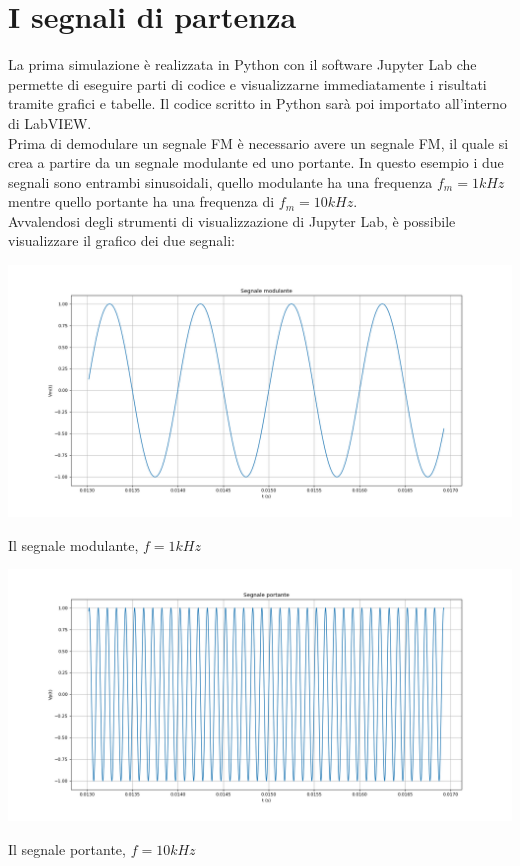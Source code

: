 \documentclass{article}
\begin{document}
\section{I segnali di partenza}
La prima simulazione è realizzata in Python con il software Jupyter Lab che permette di eseguire 
parti di codice e visualizzarne immediatamente i risultati tramite grafici e tabelle. Il codice 
scritto in Python sarà poi importato all'interno di LabVIEW.
\\
Prima di demodulare un segnale FM è necessario avere un segnale FM, il quale si crea a partire da un segnale 
modulante ed uno portante. In questo esempio i due segnali sono entrambi sinusoidali, quello modulante ha una 
frequenza $f_m = 1 kHz$ mentre quello portante ha una frequenza di $f_m = 10 kHz$.
\\
Avvalendosi degli strumenti di visualizzazione di Jupyter Lab, è possibile visualizzare il grafico dei due segnali:
\\
\begin{center}
    \includegraphics[width=\textwidth]{modulante.png}
\end{center}
Il segnale modulante, $f = 1 kHz$

\begin{center}
    \includegraphics[width=\textwidth]{portante.png}
\end{center}
Il segnale portante, $f = 10 kHz$
\end{document}
